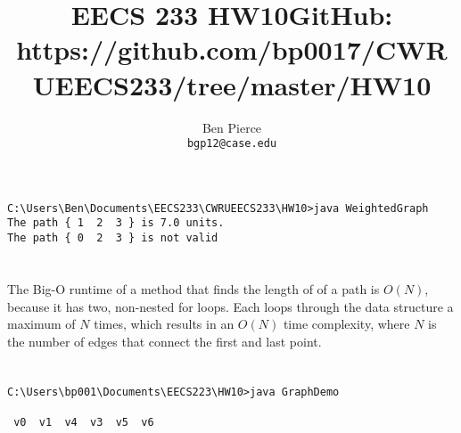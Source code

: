 \documentclass[12pt]{article} %
\title{EECS 233 HW10}
\author{Ben Pierce \\ \texttt{bgp12@case.edu}}
\begin{document}
\maketitle
\title {GitHub: https://github.com/bp0017/CWRUEECS233/tree/master/HW10} 

\section{}
\begin{lstlisting}
C:\Users\Ben\Documents\EECS233\CWRUEECS233\HW10>java WeightedGraph
The path { 1  2  3 } is 7.0 units.
The path { 0  2  3 } is not valid
\end{lstlisting}
\section{}
The Big-O runtime of a method that finds the length of of a path is $O(N)$, because it has two, non-nested for loops. Each loops through the data structure a maximum of $N$ times, which results in an $O(N)$ time complexity, where $N$ is the number of edges that connect the first and last point.
\section{}
\begin{lstlisting}
C:\Users\bp001\Documents\EECS223\HW10>java GraphDemo

 v0  v1  v4  v3  v5  v6
\end{lstlisting}
\end{document}
